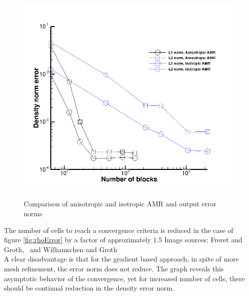 \begin{figure}[t!]
{   \includegraphics[width=0.2\textheight, trim=0cm 0cm 0 0cm,clip=true]{./figs/outflowError.png}}%
   \caption{Comparison of anisotropic and isotropic AMR and output error norms}  
   \label{fig:Gradientbased}
\end{figure}  


The number of cells to reach a convergence criteria is reduced in the case of figure \ref{fig:rhoError} by a factor of approximately $1.5$ Image sources: Freret and Groth,~\cite{Freret:2015} and Williamschen and Groth~\cite{Williamschen:2013}\\
A clear disadvantage is that for the gradient based approach, in spite of more mesh refinement, the error norm does not reduce. The graph reveals this asymptotic behavior of the convergence, yet for increased number of cells, there should be continual reduction in the density error norm.
